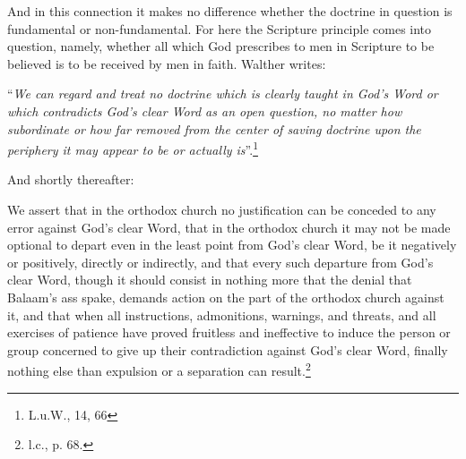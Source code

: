                 And in this connection it makes no difference whether the doctrine in question is fundamental or non-fundamental.  For here the Scripture principle comes into question, namely, whether all which God prescribes to men in Scripture to be believed is to be received by men in faith.  Walther writes: \begin{displayquote}“\textit{We can regard and treat no doctrine which is clearly taught in God’s Word or which contradicts God’s clear Word as an open question, no matter how subordinate or how far removed from the center of saving doctrine upon the periphery it may appear to be or actually is}”.\footnote{L.u.W., 14, 66}\end{displayquote}  And shortly thereafter: \begin{fancyquotes}We assert that in the orthodox church no justification can be conceded to any error against God’s clear Word, that in the orthodox church it may not be made optional to depart even in the least point from God’s clear Word, be it negatively or positively, directly or indirectly, and that every such departure from God’s clear Word, though it should consist in nothing more that the denial that Balaam’s ass spake, demands action on the part of the orthodox church against it, and that when all instructions, admonitions, warnings, and threats, and all exercises of patience have proved fruitless and ineffective to induce the person or group concerned to give up their contradiction against God’s clear Word, finally nothing else than expulsion or a separation can result.\footnote{l.c., p. 68.}\end{fancyquotes}

